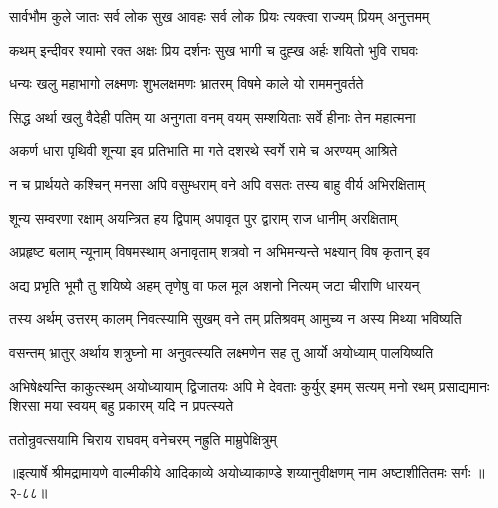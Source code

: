 \twolineshloka
{सार्वभौम कुले जातः सर्व लोक सुख आवहः}
{सर्व लोक प्रियः त्यक्त्वा राज्यम् प्रियम् अनुत्तमम्} %

\twolineshloka
{कथम् इन्दीवर श्यामो रक्त अक्षः प्रिय दर्शनः}
{सुख भागी च दुह्ख अर्हः शयितो भुवि राघवः} %

\twolineshloka
{धन्यः खलु महाभागो लक्ष्मणः शुभलक्षमणः}
{भ्रातरम् विषमे काले यो राममनुवर्तते} %

\twolineshloka
{सिद्ध अर्था खलु वैदेही पतिम् या अनुगता वनम्}
{वयम् सम्शयिताः सर्वे हीनाः तेन महात्मना} %

\twolineshloka
{अकर्ण धारा पृथिवी शून्या इव प्रतिभाति मा}
{गते दशरथे स्वर्गे रामे च अरण्यम् आश्रिते} %

\twolineshloka
{न च प्रार्थयते कश्चिन् मनसा अपि वसुम्धराम्}
{वने अपि वसतः तस्य बाहु वीर्य अभिरक्षिताम्} %

\twolineshloka
{शून्य सम्वरणा रक्षाम् अयन्त्रित हय द्विपाम्}
{अपावृत पुर द्वाराम् राज धानीम् अरक्षिताम्} %

\twolineshloka
{अप्रहृष्ट बलाम् न्यूनाम् विषमस्थाम् अनावृताम्}
{शत्रवो न अभिमन्यन्ते भक्ष्यान् विष कृतान् इव} %

\twolineshloka
{अद्य प्रभृति भूमौ तु शयिष्ये अहम् तृणेषु वा}
{फल मूल अशनो नित्यम् जटा चीराणि धारयन्} %

\twolineshloka
{तस्य अर्थम् उत्तरम् कालम् निवत्स्यामि सुखम् वने}
{तम् प्रतिश्रवम् आमुच्य न अस्य मिथ्या भविष्यति} %

\twolineshloka
{वसन्तम् भ्रातुर् अर्थाय शत्रुघ्नो मा अनुवत्स्यति}
{लक्ष्मणेन सह तु आर्यो अयोध्याम् पालयिष्यति} %

\fourlineindentedshloka
{अभिषेक्ष्यन्ति काकुत्स्थम् अयोध्यायाम् द्विजातयः}
{अपि मे देवताः कुर्युर् इमम् सत्यम् मनो रथम्}
{प्रसाद्यमानः शिरसा मया स्वयम्}
{बहु प्रकारम् यदि न प्रपत्स्यते} %

\twolineshloka
{ततोन्रुवत्सयामि चिराय राघवम्}
{वनेचरम् नह्रुति माम्रुपेक्षित्रुम्} %


॥इत्यार्षे श्रीमद्रामायणे वाल्मीकीये आदिकाव्ये अयोध्याकाण्डे शय्यानुवीक्षणम् नाम अष्टाशीतितमः सर्गः ॥२-८८॥
